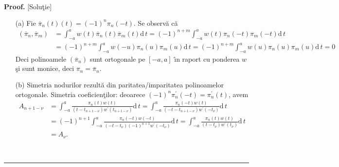 \documentclass[12pt]{article}%
\newenvironment{proof}[1][Proof]{\noindent\textbf{#1.} }{\ \rule{0.5em}{0.5em}}
\begin{document}
\begin{proof}
[Solu\c{t}ie]

\begin{enumerate}
\item[(a)] Fie $\overline{\pi}_{n}(t)(t)=(-1)^{n}\pi_{n}(-t)$. Se observ\u{a}
c\u{a}%
\begin{align*}
\left(  \overline{\pi}_{n},\overline{\pi}_{m}\right)    & =\int_{-a}%
^{a}w(t)\overline{\pi}_{n}(t)\overline{\pi}_{m}(t)\mathrm{d}\,t=(-1)^{n+m}%
\int_{-a}^{a}w(t)\pi_{n}(-t)\pi_{m}(-t)\mathrm{d}\,t\\
& =(-1)^{n+m}\int_{-a}^{a}w(-u)\pi_{n}(u)\pi_{m}(u)\mathrm{d}\,t=(-1)^{n+m}%
\int_{-a}^{a}w(u)\pi_{n}(u)\pi_{m}(u)\mathrm{d}\,t=0
\end{align*}
Deci polinoamele $\left(  \overline{\pi}_{n}\right)  $ sunt ortogonale pe
$[-a,a]$ \^{\i}n raport cu ponderea $w$ \c{s}i sunt monice, deci $\pi
_{n}=\overline{\pi}_{n}$.

\item[(b)] Simetria nodurilor rezult\u{a} din paritatea/imparitatea
polinoamelor ortogonale. Simetria coeficien\c{t}ilor: deoarece $(-1)^{n}%
\pi_{n}^{\prime}(-t)=\pi_{n}^{\prime}(t)$, avem%
\begin{align*}
A_{n+1-\nu}  & =\int_{-a}^{a}\frac{\pi_{n}(t)w(t)}{\left(  t-t_{n+1-\nu
}\right)  w^{\prime}(t_{n+1-\nu})}\mathrm{d}\,t=\int_{-a}^{a}\frac{\pi
_{n}(-t)w(t)}{\left(  -t-t_{n+1-\nu}\right)  w^{\prime}(-t_{\nu})}%
\mathrm{d}\,t\\
& =\left(  -1\right)  ^{n+1}\int_{-a}^{a}\frac{\pi_{n}(-t)w(-t)}{\left(
-t-t_{\nu}\right)  \left(  -1\right)  ^{n+1}w^{\prime}(-t_{\nu})}%
\mathrm{d}\,t=\int_{-a}^{a}\frac{\pi_{n}(t)w(t)}{\left(  t-t_{\nu}\right)
w^{\prime}(t_{\nu})}\mathrm{d}\,t\\
& =A_{\nu}.
\end{align*}



\end{enumerate}
\end{proof}
\end{document}
